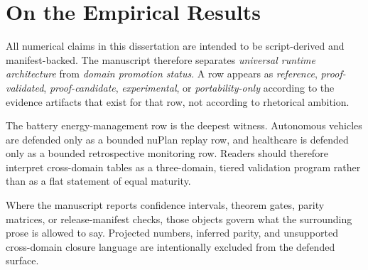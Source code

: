 \chapter*{On the Empirical Results}

All numerical claims in this dissertation are intended to be script-derived and
manifest-backed.  The manuscript therefore separates \emph{universal runtime
architecture} from \emph{domain promotion status}.  A row appears as
\emph{reference}, \emph{proof-validated}, \emph{proof-candidate},
\emph{experimental}, or \emph{portability-only} according to the evidence
artifacts that exist for that row, not according to rhetorical ambition.

The battery energy-management row is the deepest witness.  Autonomous vehicles
are defended only as a bounded nuPlan replay row, and healthcare is defended
only as a bounded retrospective monitoring row.  Readers should therefore
interpret cross-domain tables as a three-domain, tiered validation program
rather than as a flat statement of equal maturity.

Where the manuscript reports confidence intervals, theorem gates, parity
matrices, or release-manifest checks, those objects govern what the surrounding
prose is allowed to say.  Projected numbers, inferred parity, and unsupported
cross-domain closure language are intentionally excluded from the defended
surface.
